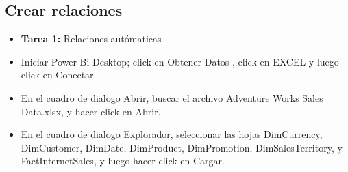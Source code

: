 \documentclass[12pt,letterpaper]{article}
\begin{document}
\subsection{Crear relaciones}
\begin{itemize}
	\item \textbf{Tarea 1:} Relaciones autómaticas
	\item Iniciar Power Bi Desktop; click en Obtener Datos , click en EXCEL y luego click en Conectar.
	\item En el cuadro de dialogo Abrir, buscar el archivo Adventure Works Sales Data.xlsx, y hacer
click en Abrir. 
	\item En el cuadro de dialogo Explorador, seleccionar las hojas DimCurrency, DimCustomer,
DimDate, DimProduct, DimPromotion, DimSalesTerritory, y FactInternetSales, y luego hacer click en Cargar.


\end{itemize}
\end{document}
